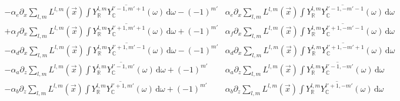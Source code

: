 \documentclass{egpubl}
\newcommand{\ud}{\,\mathrm{d}} %
\newcommand{\SHBC}{Y_{\mathbb{C}}} %
\begin{document}
\begin{align}
\\
-\alpha_e\partial_x\sum_{l,m}L^{l,m}\left (\vec{x}\right)\int{Y_{\mathbb{R}}^{l,m}\overline{\SHBC^{l'-1, m'+1}}(\omega )\ud\omega}
-\left({-1}\right)^{m'}&\alpha_e\partial_x\sum_{l,m}L^{l,m}\left (\vec{x}\right)\int{Y_{\mathbb{R}}^{l,m}\overline{\SHBC^{l'-1, -m'-1}}(\omega )\ud\omega}
\\
+\alpha_f\partial_x\sum_{l,m}L^{l,m}\left (\vec{x}\right)\int{Y_{\mathbb{R}}^{l,m}\overline{\SHBC^{l'+1, m'+1}}(\omega )\ud\omega}
+\left({-1}\right)^{m'}&\alpha_f\partial_x\sum_{l,m}L^{l,m}\left (\vec{x}\right)\int{Y_{\mathbb{R}}^{l,m}\overline{\SHBC^{l'+1, -m'-1}}(\omega )\ud\omega}
\\
-\alpha_d\partial_x\sum_{l,m}L^{l,m}\left (\vec{x}\right)\int{Y_{\mathbb{R}}^{l,m}\overline{\SHBC^{l'+1, m'-1}}(\omega )\ud\omega}
-\left({-1}\right)^{m'}&\alpha_d\partial_x\sum_{l,m}L^{l,m}\left (\vec{x}\right)\int{Y_{\mathbb{R}}^{l,m}\overline{\SHBC^{l'+1, -m'+1}}(\omega )\ud\omega}
\\
-\alpha_a\partial_z\sum_{l,m}L^{l,m}\left (\vec{x}\right)\int{Y_{\mathbb{R}}^{l,m}\overline{\SHBC^{l'-1, m'}}(\omega )\ud\omega}
+\left({-1}\right)^{m'}&\alpha_a\partial_z\sum_{l,m}L^{l,m}\left (\vec{x}\right)\int{Y_{\mathbb{R}}^{l,m}\overline{\SHBC^{l'-1, -m'}}(\omega )\ud\omega}
\\
-\alpha_b\partial_z\sum_{l,m}L^{l,m}\left (\vec{x}\right)\int{Y_{\mathbb{R}}^{l,m}\overline{\SHBC^{l'+1, m'}}(\omega )\ud\omega}
+\left({-1}\right)^{m'}&\alpha_b\partial_z\sum_{l,m}L^{l,m}\left (\vec{x}\right)\int{Y_{\mathbb{R}}^{l,m}\overline{\SHBC^{l'+1, -m'}}(\omega )\ud\omega}
\end{align}
\end{document}
